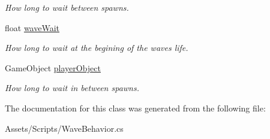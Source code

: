 \begin{DoxyCompactItemize}
\begin{DoxyCompactList}\small\item\em How long to wait between spawns. \end{DoxyCompactList}\item 
\mbox{\label{class_wave_behavior_a3f40e6d29cd2c0814506f93d19c10f2b}} 
float \mbox{\hyperlink{class_wave_behavior_a3f40e6d29cd2c0814506f93d19c10f2b}{wave\+Wait}}
\begin{DoxyCompactList}\small\item\em How long to wait at the begining of the wave\textquotesingle{}s life. \end{DoxyCompactList}\item 
\mbox{\label{class_wave_behavior_a97c0d24bc7af3d86d245206339a04d1f}} 
Game\+Object \mbox{\hyperlink{class_wave_behavior_a97c0d24bc7af3d86d245206339a04d1f}{player\+Object}}
\begin{DoxyCompactList}\small\item\em How long to wait in between spawns. \end{DoxyCompactList}\end{DoxyCompactItemize}


The documentation for this class was generated from the following file\+:\begin{DoxyCompactItemize}
\item 
Assets/\+Scripts/Wave\+Behavior.\+cs\end{DoxyCompactItemize}
